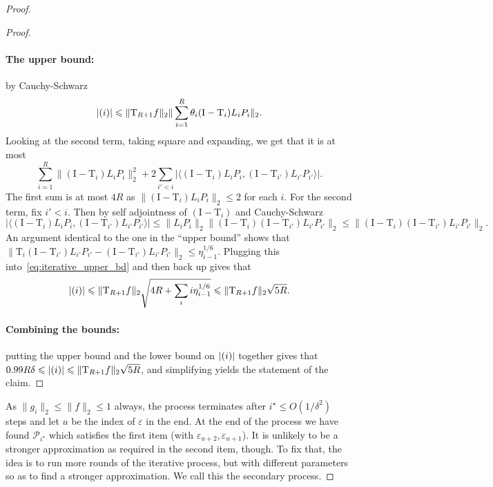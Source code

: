 \documentclass[10pt,a4paper]{amsart}
\newcommand\card[1]{\left| {#1} \right|}
\newcommand\norm[1]{\| #1 \|}
\newcommand\inner[2]{\langle{#1},{#2}\rangle}
\newcommand\eps{\varepsilon}
\renewcommand\leq{\leqslant}
\newcommand{\rom}[1]{\uppercase\expandafter{\romannumeral #1\relax}}
\begin{document}
\begin{proof}
\begin{proof}
        \paragraph{The upper bound:} by Cauchy-Schwarz
        \[
        \card{(\rom{1})}
        \leq \norm{\mathrm{T}_{R+1}f}_2
        \norm{\sum\limits_{i=1}^{R}\theta_i (\mathrm{I}-\mathrm{T}_i)L_i P_i}_2.
        \]
        Looking at the second term, taking square and expanding, we get that it is at most
        \begin{equation}\label{eq:iterative_upper_bd}
        \sum\limits_{i=1}^{R}
        \norm{(\mathrm{I}-\mathrm{T}_i)L_i P_i}_2^2
        +2\sum\limits_{i'<i}
        \card{
        \inner{
        (\mathrm{I}-\mathrm{T}_i)L_i P_i}{(\mathrm{I}-\mathrm{T}_{i'})L_{i'} P_{i'}}}.
        \end{equation}
        The first sum is at most $4R$ as 
        $\norm{(\mathrm{I}-\mathrm{T}_i)L_i P_i}_2\leq 2$ for each $i$. For the second term, fix $i'<i$. Then by self adjointness of $(\mathrm{I}-\mathrm{T}_i)$ and Cauchy-Schwarz
        \[
        \card{\inner{
        (\mathrm{I}-\mathrm{T}_i)L_i P_i}{(\mathrm{I}-\mathrm{T}_{i'})L_{i'} P_{i'}}}
        \leq \norm{L_i P_i}_2\norm{(\mathrm{I}-\mathrm{T}_i)(\mathrm{I}-\mathrm{T}_{i'})L_{i'} P_{i'}}_2\leq 
        \norm{(\mathrm{I}-\mathrm{T}_i)(\mathrm{I}-\mathrm{T}_{i'})L_{i'} P_{i'}}_2.
        \]
        An argument identical to the one in the ``upper bound'' shows that 
        $\norm{\mathrm{T}_i(\mathrm{I}-\mathrm{T}_{i'})L_{i'} P_{i'}-(\mathrm{I}-\mathrm{T}_{i'})L_{i'} P_{i'}}_2\leq \eta_{i-1}^{1/6}$. Plugging this into~\eqref{eq:iterative_upper_bd} and then back up gives that
        \[
        \card{(\rom{1})}\leq \norm{\mathrm{T}_{R+1}f}_2
        \sqrt{4R+\sum\limits_{i}i\eta_{i-1}^{1/6}}
        \leq 
        \norm{\mathrm{T}_{R+1}f}_2\sqrt{5R}.
        \]

        \paragraph{Combining the bounds:} putting the upper bound and the lower bound on $\card{(\rom{1})}$ together gives that 
        $0.99 R \delta\leq \card{(\rom{1})}\leq \norm{\mathrm{T}_{R+1}f}_2\sqrt{5R}$, and simplifying yields the statement of the claim.
    \end{proof}
    As $\norm{g_i}_2\leq \norm{f}_2\leq 1$ always, the process terminates after $i^{\star}\leq O(1/\delta^2)$ steps and let $u$ be the index of $\eps$ in the end. At the end of the process we have found $\mathcal{P}_{i^{\star}}$  which satisfies the first item (with $\eps_{u+2},\eps_{u+1}$). It is unlikely to be a stronger approximation as required in the second item, though.
    To fix that, the idea is to run more rounds of the iterative process, but with different parameters so as to find a stronger approximation. We call this the secondary process.
    

\end{proof}
\end{document}
